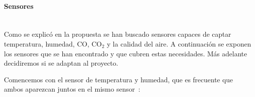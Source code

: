 \paragraph{Sensores}\mbox{} \\
Como se explicó en la propuesta se han buscado sensores capaces de captar temperatura, humedad, CO, CO$_2$ y la calidad del aire. A continuación se exponen los sensores que se han encontrado y que cubren estas necesidades. Más adelante decidiremos si se adaptan al proyecto.

Comencemos con el sensor de temperatura y humedad, que es frecuente que ambos aparezcan juntos en el mismo sensor~\cite{noauthor_comparing_2019}:

\begin{table}[H]
	\centering
	\caption{Comparación sensores de temperatura y humedad}
	\label{tab:comp_temp}
\end{table}
